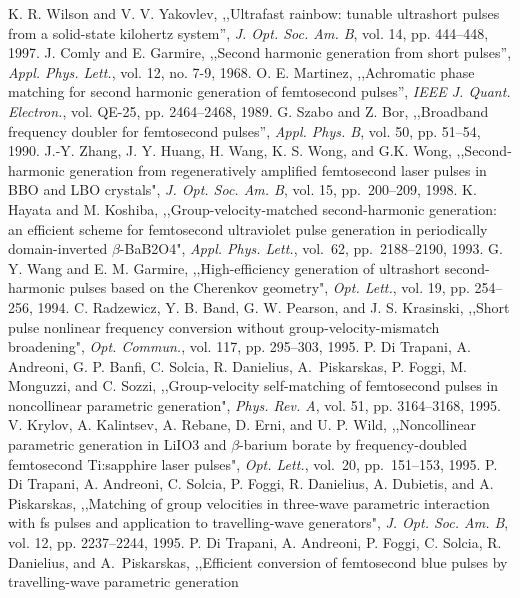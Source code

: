 \documentclass[times]{jtitauth}
\begin{document}
\begin{thebibliography}{99}
K. R. Wilson and V. V. Yakovlev, ,,Ultrafast rainbow: tunable ultrashort
 pulses from a solid-state kilohertz system'', {\it J. Opt. Soc. Am. B}, vol. 14, pp. 444--448, 1997.
J. Comly and E. Garmire, ,,Second harmonic generation from short
pulses'', {\it Appl. Phys. Lett.}, vol. 12, no. 7-9, 1968.
O. E. Martinez, ,,Achromatic phase matching for second harmonic ge\-neration
of femtosecond pulses'', {\it IEEE J. Quant. Electron.}, vol.
QE-25, pp. 2464--2468, 1989.
G. Szabo and Z. Bor, ,,Broadband frequency doubler for
femtosecond pulses'', {\it Appl. Phys. B}, vol. 50, pp. 51--54,
1990.
J.-Y. Zhang, J. Y. Huang, H. Wang, K. S. Wong, and G.K. Wong, ,,Second-harmonic
generation from regeneratively amplified femtosecond laser pulses
in BBO and LBO crystals", {\it J. Opt. Soc. Am. B}, vol. 15,
pp.~200--209, 1998.
K. Hayata and M. Koshiba,
,,Group-velocity-matched second-harmonic generation: an efficient
scheme for femtosecond ultraviolet pulse gene\-ration in
periodically domain-inverted $\beta$-BaB2O4", {\it Appl. Phys.
Lett.}, vol.~62, pp.~2188--2190, 1993.
G. Y. Wang and E. M. Garmire, ,,High-efficiency generation of ultrashort
second-harmonic pulses based on the Cherenkov geometry", {\it Opt.
Lett.}, vol. 19, pp. 254--256, 1994.
C. Radzewicz, Y. B. Band, G. W. Pearson, and J. S. Krasinski, ,,Short pulse
nonlinear frequency conversion without group-velocity-mismatch
broadening", {\it Opt. Commun.}, vol. 117, pp. 295--303, 1995.
P. Di Trapani, A. Andreoni, G. P. Banfi, C. Solcia, R. Danielius, A.~Piskarskas,
P. Foggi, M. Monguzzi, and C. Sozzi, ,,Group-velocity
self-matching of femtosecond pulses in noncollinear parametric
generation", {\it Phys. Rev. A}, vol. 51, pp. 3164--3168, 1995.
V. Krylov, A. Kalintsev, A. Rebane, D. Erni, and U. P.
Wild, ,,Noncollinear parametric generation in LiIO3 and
$\beta$-barium borate by frequency-doubled femtosecond Ti:sapphire
laser pulses", {\it Opt. Lett.}, vol.~20, pp.~151--153, 1995.
P. Di Trapani, A. Andreoni, C. Solcia, P. Foggi, R.
Danielius, A. Dubietis, and A. Piskarskas, ,,Matching of group
velocities in three-wave parametric interaction with fs pulses and
application to travelling-wave generators", {\it J. Opt. Soc. Am.
B}, vol. 12, pp. 2237--2244, 1995.
P. Di Trapani, A. Andreoni, P. Foggi, C. Solcia, R.
Danielius, and A.~Piskarskas, ,,Efficient conversion of
femtosecond blue pulses by travelling-wave parametric generation

\end{thebibliography}
\end{document}

